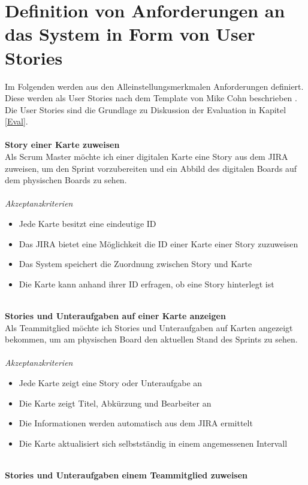 \documentclass[12pt,titlepage]{scrartcl}
\begin{document}
	\section{Definition von Anforderungen an das System in Form von User Stories} \label{stories}
	Im Folgenden werden aus den Alleinstellungsmerkmalen Anforderungen definiert. Diese werden als User Stories nach dem Template von Mike Cohn beschrieben \cite{template}. Die User Stories sind die Grundlage zu Diskussion der Evaluation in Kapitel \ref{Eval}. \\ \\
	\textbf{Story einer Karte zuweisen} \\
	Als Scrum Master möchte ich einer digitalen Karte eine Story aus dem JIRA zuweisen, um den Sprint vorzubereiten und ein Abbild des digitalen Boards auf dem physischen Boards zu sehen. \\ \\
	\textit{Akzeptanzkriterien}
	\begin{itemize}
		\setlength\itemsep{0em}
		\item Jede Karte besitzt eine eindeutige ID
		\item Das JIRA bietet eine Möglichkeit die ID einer Karte einer Story zuzuweisen
		\item Das System speichert die Zuordnung zwischen Story und Karte
		\item Die Karte kann anhand ihrer ID erfragen, ob eine Story hinterlegt ist
	\end{itemize}
	\noindent
	\\ \textbf{Stories und Unteraufgaben auf einer Karte anzeigen} \\
	Als Teammitglied möchte ich Stories und Unteraufgaben auf Karten angezeigt bekommen, um am physischen Board den aktuellen Stand des Sprints zu sehen. \\ \\
	\textit{Akzeptanzkriterien}
	\begin{itemize}
		\setlength\itemsep{0em}
		\item Jede Karte zeigt eine Story oder Unteraufgabe an
		\item Die Karte zeigt Titel, Abkürzung und Bearbeiter an
		\item Die Informationen werden automatisch aus dem JIRA ermittelt
		\item Die Karte aktualisiert sich selbstständig in einem angemessenen Intervall
	\end{itemize}
	\noindent
	\\ \textbf{Stories und Unteraufgaben einem Teammitglied zuweisen} \\
\end{document}

